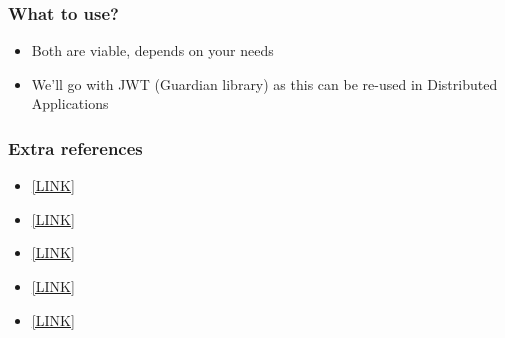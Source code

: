 \begin{frame}
    \frametitle{What to use?}

    \begin{itemize}
        \item Both are viable, depends on your needs
        \item We'll go with JWT (Guardian library) as this can be re-used in Distributed Applications
    \end{itemize}
\end{frame}

\begin{frame}
    \frametitle{Extra references}

    \begin{itemize}
        \item \href{https://medium.com/@sherryhsu/session-vs-token-based-authentication-11a6c5ac45e4}{[LINK]}
        \item \href{https://auth0.com/learn/json-web-tokens/}{[LINK]}
        \item \href{https://medium.com/@theflyingmantis/session-vs-jwt-token-based-authentication-2e85ff6c8f42}{[LINK]}
        \item \href{https://ponyfoo.com/articles/json-web-tokens-vs-session-cookies}{[LINK]}
        \item \href{https://www.pingidentity.com/fr/company/blog/posts/2019/the-hard-parts-of-jwt-security-nobody-talks-about.html}{[LINK]}
    \end{itemize}
\end{frame}
